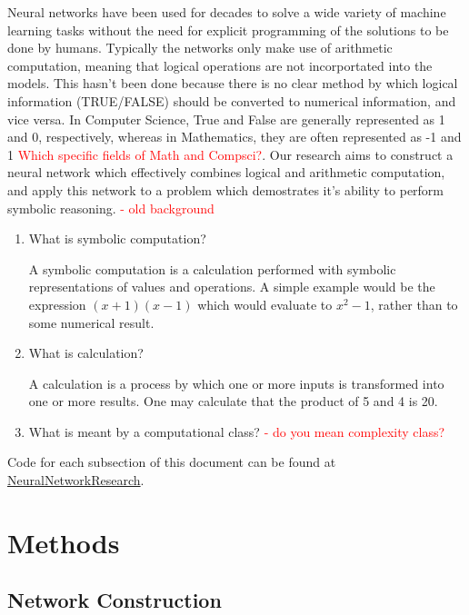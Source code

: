\documentclass{article}
\begin{document}
	Neural networks have been used for decades to solve a wide variety of machine learning tasks without the need for explicit programming of the solutions to be done by humans. Typically the networks only make use of arithmetic computation, meaning that logical operations are not incorportated into the models. This hasn't been done because there is no clear method by which logical information (TRUE/FALSE) should be converted to numerical information, and vice versa. In Computer Science, True and False are generally represented as 1 and 0, respectively, whereas in Mathematics, they are often represented as -1 and 1 \textcolor{red}{Which specific fields of Math and Compsci?}. Our research aims to construct a neural network which effectively combines logical and arithmetic computation, and apply this network to a problem which demostrates it's ability to perform symbolic reasoning.
\textcolor{red} {- old background} \\
	
    \begin{enumerate}
        \item What is symbolic computation?
        
        A symbolic computation is a calculation performed with symbolic representations of values and operations. A simple example would be the expression $(x + 1)(x - 1)$ which would evaluate to $x^2 - 1$, rather than to some numerical result.

        \item What is calculation?
        
        A calculation is a process by which one or more inputs is transformed into one or more results. One may calculate that the product of 5 and 4 is 20.
        
        \item What is meant by a computational class? \textcolor{red}{- do you mean complexity class?}
        
        
    \end{enumerate}
    
     Code for each subsection of this document can be found at \href{https://github.com/DariusBxsci/NeuralNetworkResearch/tree/master/NeuralNets}{NeuralNetworkResearch}. 


\section{Methods}

\subsection{Network Construction}
\end{document}
